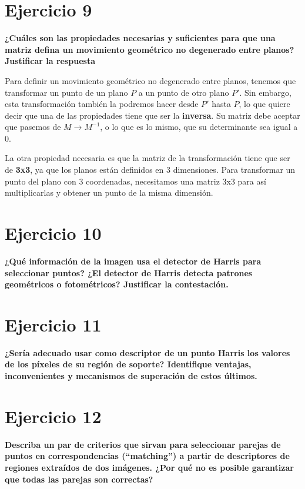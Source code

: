 \documentclass[11pt,a4paper]{article}
\begin{document}
\section*{Ejercicio 9}
\textbf{¿Cuáles son las propiedades necesarias y suficientes para que una matriz defina un movimiento geométrico no degenerado entre planos? Justificar
la respuesta}

Para definir un movimiento geométrico no degenerado entre planos, tenemos que transformar un punto de un plano $P$ a un punto de otro plano $P'$. Sin embargo,
esta transformación también la podremos hacer desde $P'$ hasta $P$, lo que quiere decir que una de las propiedades tiene que ser la \textbf{inversa}. Su
matriz debe aceptar que pasemos de $M \rightarrow M^{-1}$, o lo que es lo mismo, que su determinante sea igual a 0.

La otra propiedad necesaria es que la matriz de la transformación tiene que ser de \textbf{3x3}, ya que los planos están definidos en 3 dimensiones.
Para transformar un punto del plano con 3 coordenadas, necesitamos una matriz 3x3 para así multiplicarlas y obtener un punto de la misma dimensión.


\section*{Ejercicio 10}
\textbf{¿Qué información de la imagen usa el detector de Harris para seleccionar puntos? ¿El detector de Harris detecta patrones geométricos o fotométricos?
Justificar la contestación.}


\section*{Ejercicio 11}
\textbf{¿Sería adecuado usar como descriptor de un punto Harris los valores de los píxeles de su región de soporte? Identifique ventajas, inconvenientes y
mecanismos de superación de estos últimos.}


\section*{Ejercicio 12}
\textbf{Describa un par de criterios que sirvan para seleccionar parejas de puntos en correspondencias (“matching”) a partir de descriptores de regiones
extraídos de dos imágenes. ¿Por qué no es posible garantizar que todas las parejas son correctas?}
\end{document}
